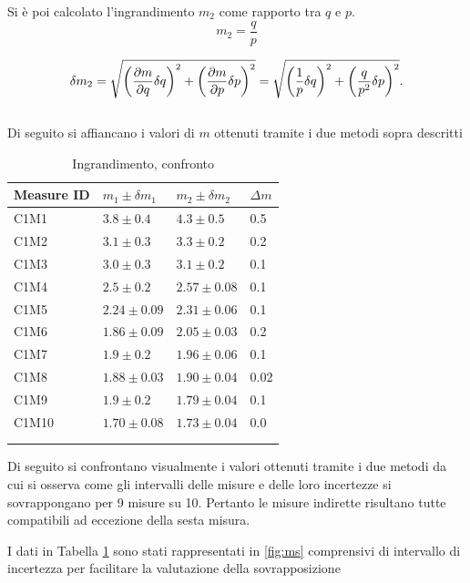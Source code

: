 \documentclass[11pt,a4paper]{article}
\begin{document}
Si è poi calcolato l'ingrandimento $m_2$ come rapporto tra $q$ e $p$.
\begin{equation}
    m_2 = \frac{q}{p}
\end{equation}

\begin{equation}
    \delta m_2 = \sqrt{\left(\frac{\partial m}{\partial q}\delta q\right )^2 + \left( \frac{\partial m}{\partial p} \delta p \right )^2}\\
    = \sqrt{\left( \frac{1}{p} \delta q \right)^2+ \left(\frac{q}{p^2}\delta p \right)^2}.
\end{equation}
\\
Di seguito si affiancano i valori di $m$ ottenuti tramite i due metodi sopra descritti

\begin{longtable}[]{@{}llll@{}}
    \toprule
    Measure ID & $m_1 \pm \delta m_1$ & $m_2 \pm \delta m_2$ & $\Delta m$ \tabularnewline
    \midrule
    \endhead
    C1M1 & $3.8   \pm 0.4 $ & $4.3  \pm 0.5 $ & 0.5 \tabularnewline
    C1M2 & $3.1   \pm 0.3 $ & $3.3  \pm 0.2 $ & 0.2 \tabularnewline
    C1M3 & $3.0   \pm 0.3 $ & $3.1  \pm 0.2 $ & 0.1 \tabularnewline
    C1M4 & $2.5   \pm 0.2 $ & $2.57 \pm 0.08$ & 0.1 \tabularnewline
    C1M5 & $2.24  \pm 0.09$ & $2.31 \pm 0.06$ & 0.1 \tabularnewline
    C1M6 & $1.86  \pm 0.09$ & $2.05 \pm 0.03$ & 0.2 \tabularnewline
    C1M7 & $1.9   \pm 0.2 $ & $1.96 \pm 0.06$ & 0.1 \tabularnewline
    C1M8 & $1.88  \pm 0.03$ & $1.90 \pm 0.04$ & 0.02 \tabularnewline
    C1M9 & $1.9   \pm 0.2 $ & $1.79 \pm 0.04$ & 0.1 \tabularnewline
    C1M10& $1.70  \pm 0.08$ & $1.73 \pm 0.04$ & 0.0 \tabularnewline
    \bottomrule
    \label{tab:ms}
    \\
    \caption{Ingrandimento, confronto}
 \end{longtable}


Di seguito si confrontano visualmente i valori ottenuti tramite i due metodi da cui si osserva come gli intervalli delle misure e delle loro incertezze si sovrappongano per 9 misure su 10. Pertanto le misure indirette risultano tutte compatibili ad eccezione della sesta misura.

I dati in Tabella \ref{tab:ms} sono stati rappresentati in \ref{fig:ms} comprensivi di intervallo di incertezza per facilitare la valutazione della sovrapposizione
\end{document}
